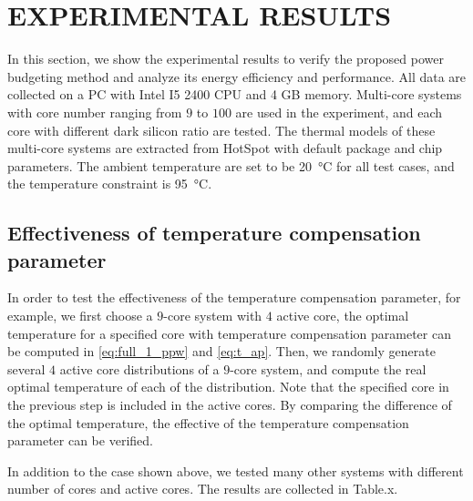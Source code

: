 \section{EXPERIMENTAL RESULTS}
In this section, we show the experimental results to verify the proposed power budgeting method and analyze its energy efficiency and performance. All data are collected on a PC with Intel I5 2400 CPU and 4 GB memory. Multi-core systems with core number ranging from $9$ to $100$ are used in the experiment, and each core with different dark silicon ratio are tested. The thermal models of these multi-core systems are extracted from HotSpot with default package and chip parameters. The ambient temperature are set to be \SI{20}{\degreeCelsius} for all test cases, and the temperature constraint is \SI{95}{\degreeCelsius}.

\subsection{Effectiveness of temperature compensation parameter}
In order to test the effectiveness of the temperature compensation parameter, for example, we first choose a $9$-core system with $4$ active core, the optimal temperature for a specified core with temperature compensation parameter can be computed in \eqref{eq:full_1_ppw} and \eqref{eq:t_ap}. Then, we randomly generate several $4$ active core distributions of a $9$-core system, and compute the real optimal temperature of each of the distribution. Note that the specified core in the previous step is included in the active cores. By comparing the difference of the optimal temperature, the effective of the temperature compensation parameter can be verified.

In addition to the case shown above, we tested many other systems with different number of cores and active cores. The results are collected in Table.x.

